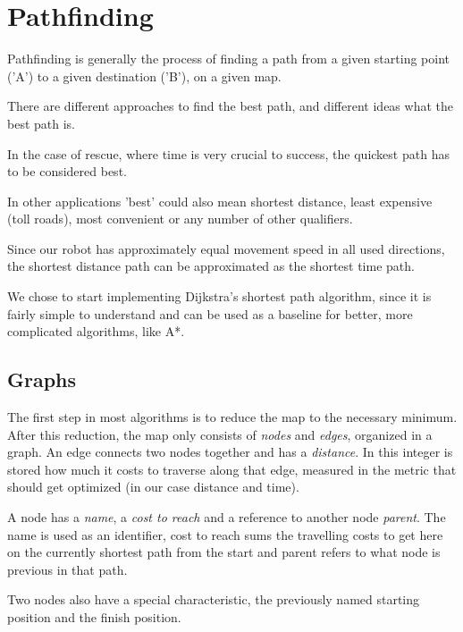 \chapter{Pathfinding}\label{ch:path}
Pathfinding is generally the process of finding a path from a given starting point ('A')
to a given destination ('B'),
on a given map.

There are different approaches to find the best path,
and different ideas what the best path is.

In the case of rescue, where time is very crucial to success,
the quickest path has to be considered best. \cite{Zipes2506}

In other applications 'best' could also mean shortest distance, least expensive (toll roads),
most convenient or any number of other qualifiers.

Since our robot has approximately equal movement speed in all used directions,
the shortest distance path can be approximated as the shortest time path.

We chose to start implementing Dijkstra's shortest path algorithm,
since it is fairly simple to understand and can be used as a baseline for better,
more complicated algorithms, like A*.

\section{Graphs}
The first step in most algorithms is to reduce the map to the necessary minimum.
After this reduction, the map only consists of \emph{nodes} and \emph{edges},
organized in a graph.
An edge connects two nodes together and has a \emph{distance}.
In this integer is stored how much it costs to traverse along that edge,
measured in the metric that should get optimized (in our case distance and time).

A node has a \emph{name}, a \emph{cost to reach} and a reference to another node \emph{parent}.
The name is used as an identifier,
cost to reach sums the travelling costs to get here on the currently shortest path from the start
and parent refers to what node is previous in that path.

Two nodes also have a special characteristic,
the previously named starting position and the finish position.



